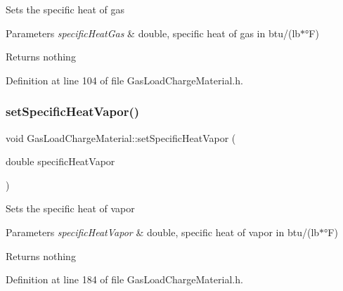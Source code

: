 Sets the specific heat of gas


\begin{DoxyParams}{Parameters}
{\em specific\+Heat\+Gas} & double, specific heat of gas in btu/(lb$\ast$°F)\\
\hline
\end{DoxyParams}
\begin{DoxyReturn}{Returns}
nothing 
\end{DoxyReturn}


Definition at line 104 of file Gas\+Load\+Charge\+Material.\+h.

\mbox{\label{class_gas_load_charge_material_a7498eba84bb8bdfc5344f0e44418260b}} 
\subsubsection{\texorpdfstring{set\+Specific\+Heat\+Vapor()}{setSpecificHeatVapor()}\hspace{0.1cm}{\footnotesize\ttfamily [1/3]}}
{\footnotesize\ttfamily void Gas\+Load\+Charge\+Material\+::set\+Specific\+Heat\+Vapor (\begin{DoxyParamCaption}\item[{double}]{specific\+Heat\+Vapor }\end{DoxyParamCaption})\hspace{0.3cm}{\ttfamily [inline]}}

Sets the specific heat of vapor


\begin{DoxyParams}{Parameters}
{\em specific\+Heat\+Vapor} & double, specific heat of vapor in btu/(lb$\ast$°F)\\
\hline
\end{DoxyParams}
\begin{DoxyReturn}{Returns}
nothing 
\end{DoxyReturn}


Definition at line 184 of file Gas\+Load\+Charge\+Material.\+h.

\mbox{\label{class_gas_load_charge_material_a7498eba84bb8bdfc5344f0e44418260b}} 
